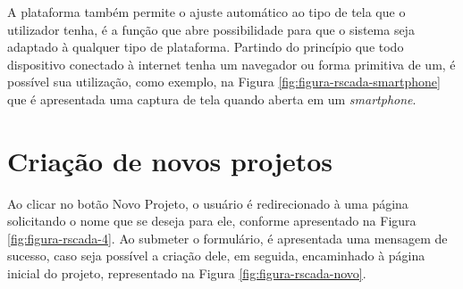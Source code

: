 A plataforma também permite o ajuste automático ao tipo de tela que o utilizador tenha, é a função que abre possibilidade para que o sistema seja adaptado à qualquer tipo de plataforma. Partindo do princípio que todo dispositivo conectado à internet tenha um navegador ou forma primitiva de um, é possível sua utilização, como exemplo, na Figura \ref{fig:figura-rscada-smartphone} que é apresentada uma captura de tela quando aberta em um \textit{smartphone}.

    	\begin{figure}[!h]
    	\end{figure}
    	
\section{Criação de novos projetos}
\label{sec:criacao-projetos}
Ao clicar no botão Novo Projeto, o usuário é redirecionado à uma página solicitando o nome que se deseja para ele, conforme apresentado na Figura \ref{fig:figura-rscada-4}. Ao submeter o formulário, é apresentada uma mensagem de sucesso, caso seja possível a criação dele, em seguida, encaminhado à página inicial do projeto, representado na Figura \ref{fig:figura-rscada-novo}. 

